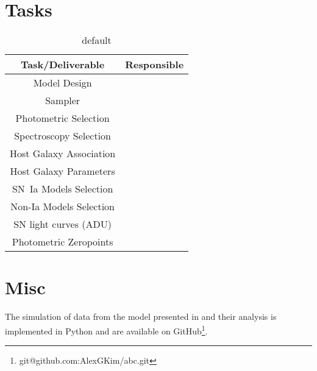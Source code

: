 \documentclass[preprint,3p]{elsarticle}
\begin{document}
\section{Tasks}
\begin{table}[htdp]
\caption{default}
\begin{center}
\begin{tabular}{|c|c|}
\hline
Task/Deliverable & Responsible \\ \hline
Model Design & \\
Sampler &\\
Photometric Selection &\\
Spectroscopy Selection &\\
Host Galaxy Association &\\
Host Galaxy Parameters &\\
SN~Ia Models Selection &\\
Non-Ia Models Selection &\\
SN light curves (ADU) &\\
Photometric Zeropoints &\\
\hline
\end{tabular}
\end{center}
\label{Tasks and Responsible Parties}
\end{table}%

\section{Misc}
The simulation of data from the model presented in
and their analysis is implemented in Python and are available
on GitHub\footnote{{git@github.com:AlexGKim/abc.git}}.

 

\end{document}
